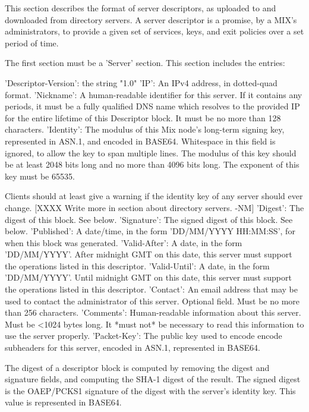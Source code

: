This section describes the format of server descriptors, as uploaded
to and downloaded from directory servers.  A server descriptor is a
promise, by a MIX's administrators, to provide a given set of
services, keys, and exit policies over a set period of time.

The first section must be a 'Server' section.  This section includes
the entries:

     'Descriptor-Version':  the string "1.0"
     'IP': An IPv4 address, in dotted-quad format.
     'Nickname': A human-readable identifier for this server.  If it
         contains any periods, it must be a fully qualified DNS name
         which resolves to the provided IP for the entire lifetime of
         this Descriptor block.  It must be no more than 128 characters.
     'Identity': The modulus of this Mix node's long-term signing key,
         represented in ASN.1, and encoded in BASE64.  Whitespace in
         this field is ignored, to allow the key to span multiple
         lines.  The modulus of this key should be at least 2048 bits
         long and no more than 4096 bits long.  The exponent of this 
         key must be 65535.

	 Clients should at least give a warning if the identity key of
         any server should ever change. [XXXX Write more in section
         about directory servers. -NM] 
     'Digest': The digest of this block. See below.
     'Signature': The signed digest of this block.  See below.
     'Published': A date/time, in the form 'DD/MM/YYYY HH:MM:SS',
         for when this block was generated.
     'Valid-After': A date, in the form 'DD/MM/YYYY'.  After midnight GMT
         on this date, this server must support the operations listed
         in this descriptor.
     'Valid-Until': A date, in the form 'DD/MM/YYYY'.  Until midnight
         GMT on this date, this server must support the operations listed
         in this descriptor.
     'Contact': An email address that may be used to contact the
         administrator of this server. Optional field.  Must be no
         more than 256 characters.
     'Comments': Human-readable information about this server.  Must
         be <1024 bytes long.  It *must not* be necessary to read this
         information to use the server properly.
     'Packet-Key': The public key used to encode encode subheaders for
         this server, encoded in ASN.1, represented in BASE64. 

The digest of a descriptor block is computed by removing the digest
and signature fields, and computing the SHA-1 digest of the result.
The signed digest is the OAEP/PCKS1 signature of the digest with the
server's identity key.  This value is represented in BASE64.

